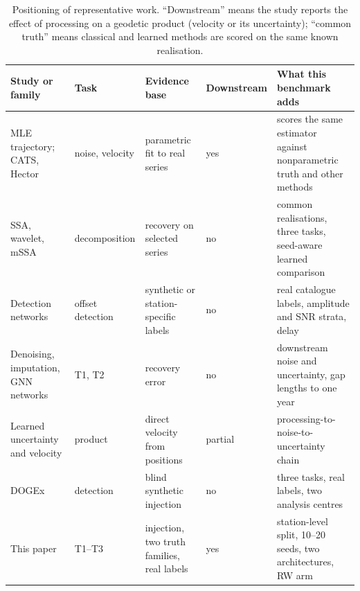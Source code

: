 \begin{table}[t]
\centering
\caption{Positioning of representative work. ``Downstream'' means the study
reports the effect of processing on a geodetic product (velocity or its
uncertainty); ``common truth'' means classical and learned methods are scored on
the same known realisation.}
\label{tab:related}
\footnotesize
\setlength{\tabcolsep}{3pt}
\begin{tabularx}{\textwidth}{@{}p{2.4cm}p{2.0cm}Xp{1.7cm}p{2.8cm}@{}}
\toprule
Study or family & Task & Evidence base & Downstream & What this benchmark adds \\
\midrule
MLE trajectory; CATS, Hector & noise, velocity & parametric fit to real series & yes & scores the same estimator against nonparametric truth and other methods \\
SSA, wavelet, mSSA & decomposition & recovery on selected series & no & common realisations, three tasks, seed-aware learned comparison \\
Detection networks & offset detection & synthetic or station-specific labels & no & real catalogue labels, amplitude and SNR strata, delay \\
Denoising, imputation, GNN networks & T1, T2 & recovery error & no & downstream noise and uncertainty, gap lengths to one year \\
Learned uncertainty and velocity & product & direct velocity from positions & partial & processing-to-noise-to-uncertainty chain \\
DOGEx & detection & blind synthetic injection & no & three tasks, real labels, two analysis centres \\
This paper & T1--T3 & injection, two truth families, real labels & yes & station-level split, 10--20 seeds, two architectures, RW arm \\
\bottomrule
\end{tabularx}
\end{table}

